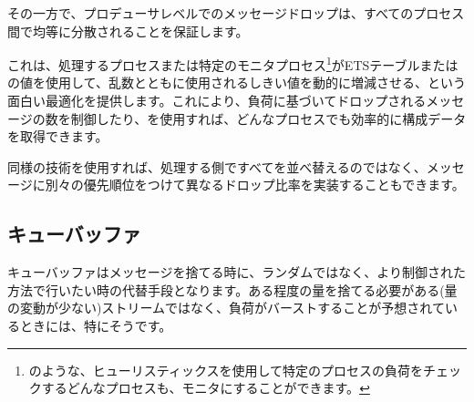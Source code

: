 その一方で、プロデューサレベルでのメッセージドロップは、すべてのプロセス間で均等に分散されることを保証します。

これは、処理するプロセスまたは特定のモニタプロセス\footnote{のような、ヒューリスティックスを使用して特定のプロセスの負荷をチェックするどんなプロセスも、モニタにすることができます。}がETSテーブルまたは  の値を使用して、乱数とともに使用されるしきい値を動的に増減させる、という面白い最適化を提供します。これにより、負荷に基づいてドロップされるメッセージの数を制御したり、を使用すれば、どんなプロセスでも効率的に構成データを取得できます。

同様の技術を使用すれば、処理する側ですべてを並べ替えるのではなく、メッセージに別々の優先順位をつけて異なるドロップ比率を実装することもできます。

\subsection{キューバッファ}

キューバッファはメッセージを捨てる時に、ランダムではなく、より制御された方法で行いたい時の代替手段となります。ある程度の量を捨てる必要がある(量の変動が少ない)ストリームではなく、負荷がバーストすることが予想されているときには、特にそうです。

